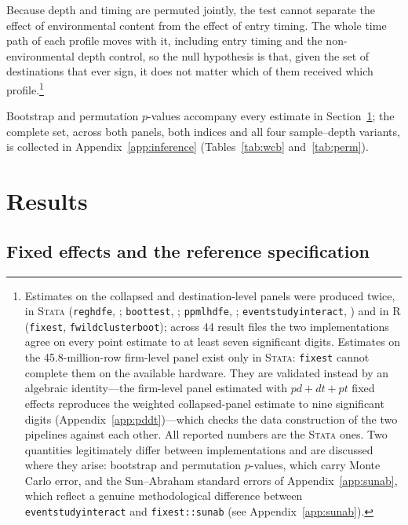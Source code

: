 \documentclass[12pt]{article}
\begin{document}
Because depth and timing are permuted jointly, the test cannot separate the effect
of environmental content from the effect of entry timing. The whole time path of each profile moves with it, including entry timing and the non-environmental depth control, so the null hypothesis is that, given the set of destinations that ever sign, it does not matter which of them received which profile.\footnote{Estimates on the collapsed and destination-level panels were produced twice, in \textsc{Stata}
(\texttt{reghdfe}, \citealp{correia2017}; \texttt{boottest},
\citealp{roodman2019}; \texttt{ppmlhdfe}, \citealp{correia2020};
\texttt{eventstudyinteract}, \citealp{sun2021}) and in \textsc{R}
(\texttt{fixest}, \texttt{fwildclusterboot}); across 44 result files the two implementations agree on every point estimate to at least
seven significant digits. Estimates on the 45.8-million-row firm-level panel exist only in \textsc{Stata}: \texttt{fixest} cannot complete them on the available hardware. They are validated instead by an algebraic identity---the firm-level panel estimated with $pd+dt+pt$ fixed effects reproduces the weighted collapsed-panel estimate to nine significant digits (Appendix~\ref{app:pddt})---which checks the data construction of the two pipelines against each other. All reported numbers are the \textsc{Stata}
ones. Two quantities
legitimately differ between implementations and are discussed where they arise:
bootstrap and permutation $p$-values, which carry Monte Carlo error, and the
Sun--Abraham standard errors of Appendix~\ref{app:sunab}, which reflect a genuine
methodological difference between \texttt{eventstudyinteract} and
\texttt{fixest::sunab} (see Appendix~\ref{app:sunab}).}

Bootstrap and permutation $p$-values accompany every estimate in Section~\ref{sec:results}; the
complete set, across both panels, both indices and all four sample--depth variants, is collected in
Appendix~\ref{app:inference} (Tables~\ref{tab:wcb} and~\ref{tab:perm}).
\section{Results}\label{sec:results}

\subsection{Fixed effects and the reference specification}\label{sec:fe}
\end{document}
